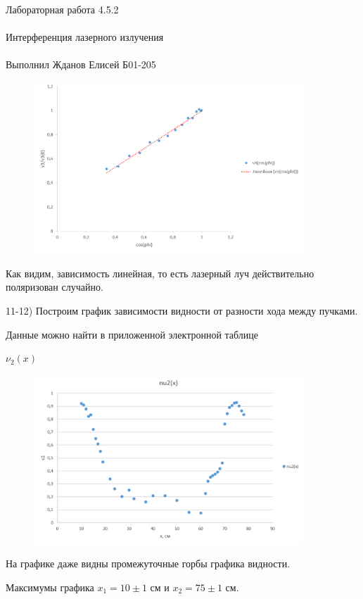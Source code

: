 \documentclass{astroedu-lab}
\begin{document}
\begin{problem}{\huge Лабораторная работа 4.5.2\\\\Интерференция лазерного излучения\\\\Выполнил Жданов Елисей Б01-205}
\begin{figure}[!h]
	\centering
	\includegraphics[width=0.9\textwidth]{gr1.png}
	\label{fig:boiler}
\end{figure}

Как видим, зависимость линейная, то есть лазерный луч действительно поляризован случайно.

11-12) Построим график зависимости видности от разности хода между пучками.

Данные можно найти в приложенной электронной таблице

\newpage

\begin{center}
	\Large $\nu_2(x)$
\end{center}

\begin{figure}[!h]
	\centering
	\includegraphics[width=0.9\textwidth]{gr2.png}
	\label{fig:boiler}
\end{figure}

На графике даже видны промежуточные горбы графика видности.

Максимумы графика $x_1 = 10 \pm 1$ см и $x_2 = 75 \pm 1$ см.


\end{problem}
\end{document}
